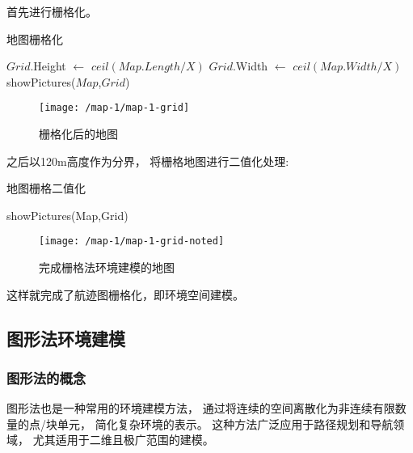 \documentclass[12pt,a4paper,oneside,UTF8]{ctexart}
\begin{document}
首先进行栅格化。

\begin{algorithm}[H]
  \caption{地图栅格化}\label{algorithm-grid}

  $Grid$.Height $\leftarrow$ $ceil(Map.Length/X)$\;
  $Grid$.Width $\leftarrow$ $ceil(Map.Width/X)$\;
  showPictures($Map$,$Grid$)\;
\end{algorithm}

\begin{figure}[H]
  \centering
  \texttt{[image: /map-1/map-1-grid]}
  \caption{栅格化后的地图}
  \label{fig:map-1-grid}
\end{figure}

之后以120m高度作为分界，
将栅格地图进行二值化处理:

\begin{algorithm}[H]
  \caption{地图栅格二值化}\label{algorithm-grid-noted}

  showPictures(Map,Grid)\;
\end{algorithm}

\begin{figure}[H]
  \centering
  \texttt{[image: /map-1/map-1-grid-noted]}
  \caption{完成栅格法环境建模的地图}
  \label{fig:map-1-grid-noted}
\end{figure}

这样就完成了航迹图栅格化，即环境空间建模。
\subsection{图形法环境建模}
\subsubsection{图形法的概念}
图形法也是一种常用的环境建模方法，
通过将连续的空间离散化为非连续有限数量的点/块单元，
简化复杂环境的表示。
这种方法广泛应用于路径规划和导航领域，
尤其适用于二维且极广范围的建模。
\end{document}
